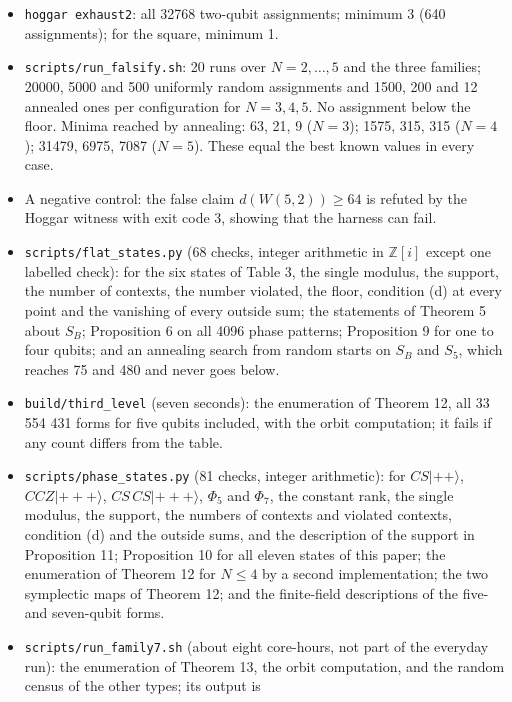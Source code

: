 \documentclass[11pt,a4paper]{article}
\providecommand{\tightlist}{\setlength{\itemsep}{0pt}\setlength{\parskip}{0pt}}
\begin{document}
\begin{itemize}
\tightlist
\item
  \texttt{hoggar\ exhaust2}: all 32768 two-qubit assignments; minimum 3 (640 assignments); for the square,
  minimum 1.
\item
  \texttt{scripts/run\_falsify.sh}: 20 runs over \(N = 2, \dots, 5\) and the three families; 20000, 5000 and 500
  uniformly random assignments and 1500, 200 and 12 annealed ones per configuration for
  \(N = 3, 4, 5\). No assignment below the floor. Minima reached by annealing: 63, 21, 9 (\(N=3\));
  1575, 315, 315 (\(N=4\)); 31479, 6975, 7087 (\(N=5\)). These equal the best known values in every case.
\item
  A negative control: the false claim \(d(W(5,2)) \ge 64\) is refuted by the Hoggar witness with exit
  code 3, showing that the harness can fail.
\item
  \texttt{scripts/flat\_states.py} (68 checks, integer arithmetic in \(\mathbb{Z}[i]\) except one labelled check):
  for the six states of Table 3, the single modulus, the support, the number of contexts, the number
  violated, the floor, condition (d) at every point and the vanishing of every outside sum; the statements
  of Theorem 5 about \(S_B\); Proposition 6 on all 4096 phase patterns; Proposition 9 for one to four
  qubits; and an annealing search from random starts on \(S_B\) and \(S_5\), which reaches 75 and 480 and
  never goes below.
\item
  \texttt{build/third\_level} (seven seconds): the enumeration of Theorem 12, all 33 554 431 forms for five
  qubits included, with the orbit computation; it fails if any count differs from the table.
\item
  \texttt{scripts/phase\_states.py} (81 checks, integer arithmetic): for \(CS|{+}{+}\rangle\), \(CCZ|{+}{+}{+}\rangle\),
  \(CS\,CS|{+}{+}{+}\rangle\), \(\Phi_5\) and \(\Phi_7\), the constant rank, the single modulus, the support, the
  numbers of contexts and violated contexts, condition (d) and the outside sums, and the description of
  the support in Proposition 11; Proposition 10 for all eleven states of this paper; the enumeration of
  Theorem 12 for \(N \le 4\) by a second implementation; the two symplectic maps of Theorem 12; and the
  finite-field descriptions of the five- and seven-qubit forms.
\item
  \texttt{scripts/run\_family7.sh} (about eight core-hours, not part of the everyday run): the enumeration of
  Theorem 13, the orbit computation, and the random census of the other types; its output is

\end{itemize}
\end{document}
